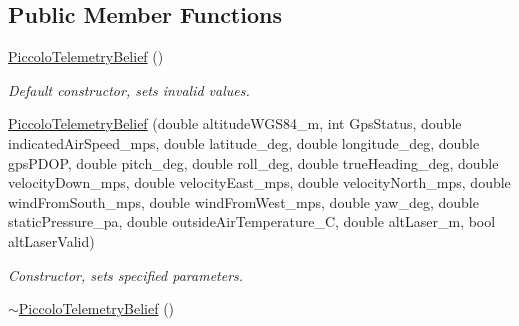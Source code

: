 \subsection*{Public Member Functions}
\begin{DoxyCompactItemize}
\item 
\hypertarget{class_piccolo_telemetry_belief_a9e492de607bfe7688859ced00f81e22d}{
\hyperlink{class_piccolo_telemetry_belief_a9e492de607bfe7688859ced00f81e22d}{PiccoloTelemetryBelief} ()}
\label{class_piccolo_telemetry_belief_a9e492de607bfe7688859ced00f81e22d}

\begin{DoxyCompactList}\small\item\em Default constructor, sets invalid values. \end{DoxyCompactList}\item 
\hyperlink{class_piccolo_telemetry_belief_a86fd07a7d8a95aa2c83d5f6f9a3f6e92}{PiccoloTelemetryBelief} (double altitudeWGS84\_\-m, int GpsStatus, double indicatedAirSpeed\_\-mps, double latitude\_\-deg, double longitude\_\-deg, double gpsPDOP, double pitch\_\-deg, double roll\_\-deg, double trueHeading\_\-deg, double velocityDown\_\-mps, double velocityEast\_\-mps, double velocityNorth\_\-mps, double windFromSouth\_\-mps, double windFromWest\_\-mps, double yaw\_\-deg, double staticPressure\_\-pa, double outsideAirTemperature\_\-C, double altLaser\_\-m, bool altLaserValid)
\begin{DoxyCompactList}\small\item\em Constructor, sets specified parameters. \end{DoxyCompactList}\item 
\hypertarget{class_piccolo_telemetry_belief_a083fd22adcc2e8785900d560ef51c7bf}{
\hyperlink{class_piccolo_telemetry_belief_a083fd22adcc2e8785900d560ef51c7bf}{$\sim$PiccoloTelemetryBelief} ()}
\label{class_piccolo_telemetry_belief_a083fd22adcc2e8785900d560ef51c7bf}


\end{DoxyCompactItemize}
